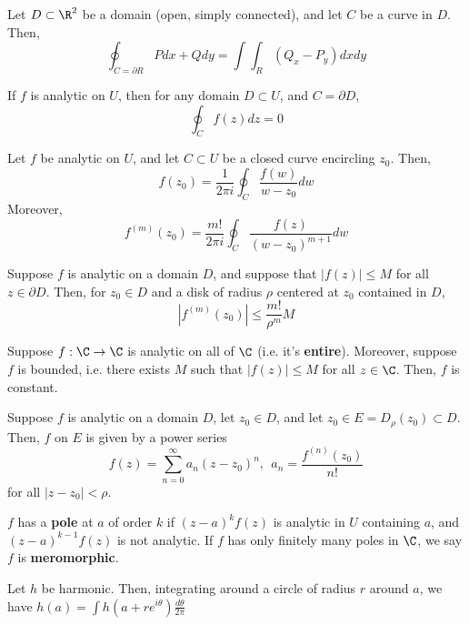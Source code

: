 \begin{thm}
    Let $D \subset \R^2$ be a domain (open, simply connected), and let $C$ be a curve in $D$. Then,
    $$\oint_{C=\partial R}Pdx+Qdy=\int\int_R (Q_x-P_y)dxdy$$
\end{thm}

\begin{thm}
    If $f$ is analytic on $U$, then for any domain $D \subset U$, and $C = \partial D$,
    $$\oint _C f(z)dz=0$$
\end{thm}

\begin{cor}
    Let $f$ be analytic on $U$, and let $C \subset U$ be a closed curve encircling $z_0$. Then,
    $$f(z_0) =\frac{1}{2\pi i} \oint_C \frac{f(w)}{w-z_0}dw$$
    Moreover,
    $$f^{(m)}(z_0)=\frac{m!}{2\pi i}\oint_C \frac{f(z)}{(w-z_0)^{m+1}}dw$$
\end{cor}

\begin{cor}
    Suppose $f$ is analytic on a domain $D$, and suppose that $|f(z)| \leq M$ for all $z \in \partial D$. Then, for $z_0 \in D$ and a disk of radius $\rho$ centered at $z_0$ contained in $D$,
    $$|f^{(m)}(z_0)| \leq \frac{m!}{\rho ^m}M$$
\end{cor}

\begin{cor}
    Suppose $f: \C \to \C$ is analytic on all of $\C$ (i.e. it's \textbf{entire}). Moreover, suppose $f$ is bounded, i.e. there exists $M$ such that $|f(z)| \leq M$ for all $z \in \C$. Then, $f$ is constant.
\end{cor}

\begin{prop}
    Suppose $f$ is analytic on a domain $D$, let $z_0 \in D$, and let $z_0 \in E=D_\rho(z_0) \subset D$. Then, $f$ on $E$ is given by a power series
    $$f(z) = \sum _{n=0}^\infty a_n(z-z_0)^n,\:\: a_n=\frac{f^{(n)}(z_0)}{n!}$$
    for all $|z-z_0| < \rho$.
\end{prop}

\begin{defn}
    $f$ has a \textbf{pole} at $a$ of order $k$ if $(z-a)^kf(z)$ is analytic in $U$ containing $a$, and $(z-a)^{k-1}f(z)$ is not analytic. If $f$ has only finitely many poles in $\C$, we say $f$ is \textbf{meromorphic}.
\end{defn}

\begin{prop}
    Let $h$ be harmonic. Then, integrating around a circle of radius $r$ around $a$, we have $h(a) = \int h(a+re^{i \theta})\frac{d \theta}{2 \pi}$
\end{prop}

